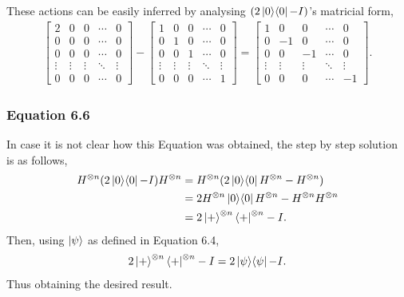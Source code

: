 These actions can be easily inferred by analysing $(2 \mathop{\mathinner{ |{0}\rangle \langle{0}|}} - I)$'s matricial form,
\begin{align}
    \left[ \begin{matrix}
        2 & 0 & 0 & \cdots & 0 \\
        0 & 0 & 0 & \cdots & 0 \\
        0 & 0 & 0 & \cdots & 0 \\
        \vdots & \vdots & \vdots & \ddots & \vdots \\
        0 & 0 & 0 & \cdots & 0
    \end{matrix} \right]
    -
    \left[ \begin{matrix}
        1 & 0 & 0 & \cdots & 0 \\
        0 & 1 & 0 & \cdots & 0 \\
        0 & 0 & 1 & \cdots & 0 \\
        \vdots & \vdots & \vdots & \ddots & \vdots \\
        0 & 0 & 0 & \cdots & 1
    \end{matrix} \right]
    =
    \left[ \begin{matrix}
        1 & 0 & 0 & \cdots & 0 \\
        0 & -1 & 0 & \cdots & 0 \\
        0 & 0 & -1 & \cdots & 0 \\
        \vdots & \vdots & \vdots & \ddots & \vdots \\
        0 & 0 & 0 & \cdots & -1
    \end{matrix} \right].
\end{align}

\subsubsection{Equation 6.6}
\label{sec:nielsen-and-chuang-equation-6-6}
In case it is not clear how this Equation was obtained,
the step by step solution is as follows,
\begin{align}
    H^{\otimes n} (2 \mathop{\mathinner{ |{0}\rangle \langle{0}|}} - I) H^{\otimes n} &=
        H^{\otimes n} (2 \mathop{\mathinner{ |{0}\rangle \langle{0}|}} H^{\otimes n} - H^{\otimes n}) \\
    &= 2 H^{\otimes n} \mathop{\mathinner{ |{0}\rangle \langle{0}|}} H^{\otimes n} - H^{\otimes n} H^{\otimes n} \\
    &= 2 \ket{+}^{\otimes n} \bra{+}^{\otimes n} - I.
\end{align}
Then, using $\ket\psi$ as defined in Equation 6.4,
\begin{align}
    2 \ket{+}^{\otimes n} \bra{+}^{\otimes n} - I = 2 \mathop{\mathinner{ |{\psi}\rangle \langle{\psi}|}} - I.
\end{align}
Thus obtaining the desired result.

